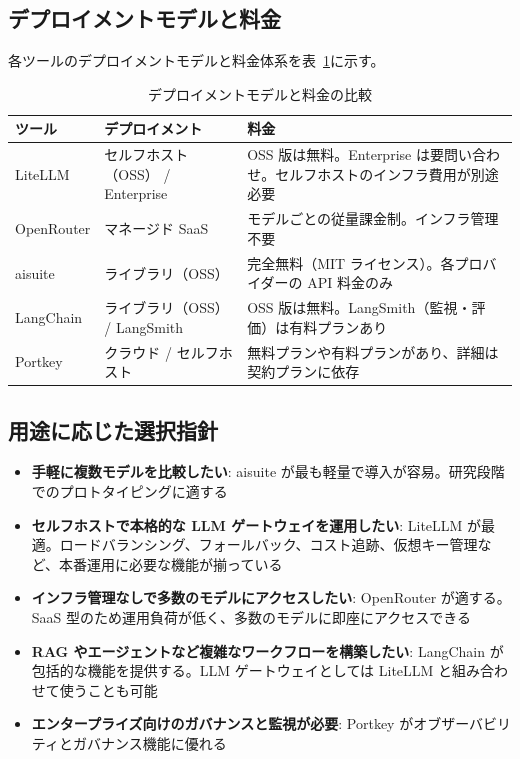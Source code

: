 \documentclass[a4paper,11pt]{ltjsarticle}
\begin{document}
\subsection{デプロイメントモデルと料金}

各ツールのデプロイメントモデルと料金体系を表~\ref{tab:deployment}に示す。

\begin{table}[htbp]
\centering
\caption{デプロイメントモデルと料金の比較}
\label{tab:deployment}
\small
\begin{tabular}{llp{6.5cm}}
\toprule
ツール & デプロイメント & 料金 \\
\midrule
LiteLLM    & セルフホスト（OSS） / Enterprise & OSS 版は無料。Enterprise は要問い合わせ。セルフホストのインフラ費用が別途必要 \\
OpenRouter & マネージド SaaS               & モデルごとの従量課金制。インフラ管理不要 \\
aisuite    & ライブラリ（OSS）              & 完全無料（MIT ライセンス）。各プロバイダーの API 料金のみ \\
LangChain  & ライブラリ（OSS） / LangSmith  & OSS 版は無料。LangSmith（監視・評価）は有料プランあり \\
Portkey    & クラウド / セルフホスト          & 無料プランや有料プランがあり、詳細は契約プランに依存 \\
\bottomrule
\end{tabular}
\end{table}

\subsection{用途に応じた選択指針}

\begin{itemize}
  \item \textbf{手軽に複数モデルを比較したい}:
    aisuite が最も軽量で導入が容易。研究段階でのプロトタイピングに適する

  \item \textbf{セルフホストで本格的な LLM ゲートウェイを運用したい}:
    LiteLLM が最適。ロードバランシング、フォールバック、コスト追跡、仮想キー管理など、本番運用に必要な機能が揃っている

  \item \textbf{インフラ管理なしで多数のモデルにアクセスしたい}:
    OpenRouter が適する。SaaS 型のため運用負荷が低く、多数のモデルに即座にアクセスできる

  \item \textbf{RAG やエージェントなど複雑なワークフローを構築したい}:
    LangChain が包括的な機能を提供する。LLM ゲートウェイとしては LiteLLM と組み合わせて使うことも可能

  \item \textbf{エンタープライズ向けのガバナンスと監視が必要}:
    Portkey がオブザーバビリティとガバナンス機能に優れる
\end{itemize}
\end{document}
